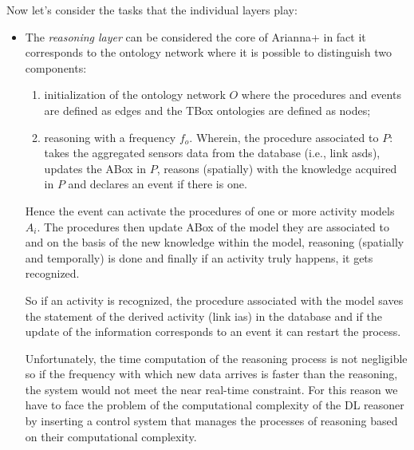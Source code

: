 \documentclass{thesisreport}
\begin{document}
 Now let's consider the tasks that the individual layers play:
 \begin{itemize}
     \item The \textit{reasoning layer} can be considered the core of Arianna+ in fact it corresponds to the ontology network where it is possible to distinguish two components:
     \begin{enumerate}
         \item initialization of the ontology network $O$ where the procedures and events are defined as edges and the TBox ontologies are defined as nodes;
         \item reasoning with a frequency $f_o$. Wherein, the procedure associated to $P$: takes the aggregated sensors data from the database (i.e., link asds), updates the ABox in $P$, reasons (spatially) with the knowledge acquired in $P$ and declares an event if there is one.
     \end{enumerate}
     Hence the event can activate the procedures of one or more activity models $A_i$. The procedures then update ABox of the model they are associated to and on the basis of the new knowledge within the model, reasoning (spatially and temporally) is done and finally if an activity truly happens, it gets recognized.
     
     
     So if an activity is recognized, the procedure associated with the model saves the statement of the derived activity (link ias) in the database and if the update of the information corresponds to an event it can restart the process.
     
     Unfortunately, the time computation of the reasoning process is not negligible so if the frequency with which new data arrives is faster than the reasoning, the system would not meet the near real-time constraint.
     For this reason we have to face the problem of the computational complexity of the DL reasoner by inserting a control system that manages the processes of reasoning based on their computational complexity.
     

\end{itemize}
\end{document}
